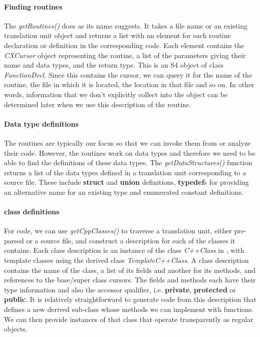 \documentclass[article]{jss}
\def\Cpp{\proglang{C$++$}}
\def\R{\proglang{R}}
\def\Rfunc#1{\textsl{#1()}}
\def\Rclass#1{\textit{#1}}
\def\Cppkeyword#1{\textbf{#1}}
\def\Ckeyword#1{\textbf{#1}}
\begin{document}
\paragraph{Finding routines}
The \Rfunc{getRoutines} does as its name suggests. It takes a file
name or an existing translation unit object and returns a list with an
element for each routine declaration or definition in the
corresponding code.  Each element contains the \Rclass{CXCursor}
object representing the routine, a list of the parameters giving their
name and data types, and the return type.  This is an S4
object of class \Rclass{FunctionDecl}. Since this contains the cursor,
we can query it for the name of the routine, the file in which it is
located, the location in that file and so on. In other words,
information that we don't explicitly collect into the \R{} object can
be determined later when we use this description of the routine.

\paragraph{Data type definitions}
The routines are typically our focus so that we can invoke them from
\R{} or analyze their code. However, the routines work on data types
and therefore we need to be able to find the definitions of these data
types.  The \Rfunc{getDataStructures} function returns a list of the
data types defined in a translation unit corresponding to a source
file.  These include \Ckeyword{struct} and \Ckeyword{union}
definitions, \Ckeyword{typedef}s for providing an alternative name for
an existing type and enumerated constant definitions.

\paragraph{\Cpp{} class definitions}
For \Cpp{} code, we can use \Rfunc{getCppClasses} to traverse a
translation unit, either pre-parsed or a source file, and construct a
description for each of the \Cpp{} classes it contains. Each class
description is an instance of the class \Rclass{C++Class} in \R, with
template classes using the derived class \Rclass{TemplateC++Class}.  A
class description contains the name of the class, a list of its fields
and another for its methods, and references to the base/super class
cursors.  The fields and methods each have their type information and
also the accessor qualifier, i.e. \Cppkeyword{private},
\Cppkeyword{protected} or \Cppkeyword{public}.  It is relatively
straightforward to generate \Cpp{} code from this description that
defines a new derived sub-class whose methods we can implement with \R{}
functions.  We can then provide \R{} instances of that class that
operate transparently as regular \Cpp{} objects.
\end{document}
